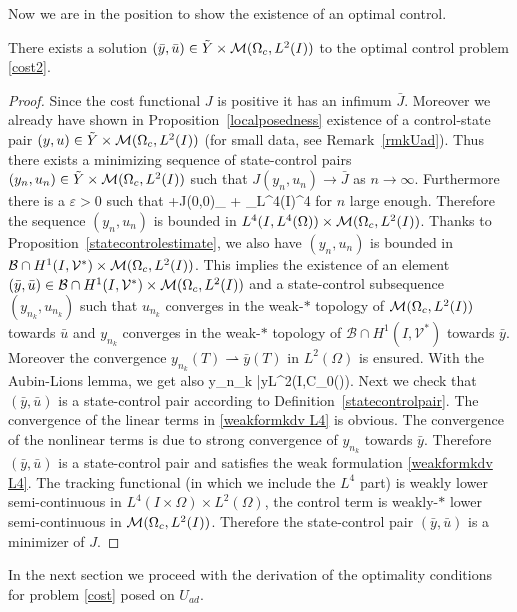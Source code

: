 Now we are in the position to show the existence of an optimal control.
\begin{proposition}
There exists a solution $(\bar y, \bar u)\in \tilde Y\times \mathcal{M}(\Omega_c, L^{2}(I)) $ to the optimal control problem \eqref{cost2}.
\end{proposition}
\begin{proof}
Since the cost functional $J$ is positive it has an infimum $\bar J$. Moreover we already have shown in Proposition~\ref{localposedness} existence of a control-state pair $(y,u)\in \tilde Y\times \mathcal{M}(\Omega_c, L^{2}(I))$ (for small data, see Remark~\ref{rmkUad}). Thus there exists a minimizing sequence of state-control pairs $(y_n,u_n) \in \tilde Y\times \mathcal{M}(\Omega_c, L^{2}(I))$ such that $J(y_n, u_n) \rightarrow \bar J$ as $n \rightarrow \infty$. Furthermore there is a $\varepsilon>0$ such that
\be
\varepsilon+J(0,0)\geq \alpha {}_{\M} +  _{L^4(I\times \Omega)}^4
\ee
for $n$ large enough. Therefore the sequence $(y_n,u_n)$ is bounded in $L^4(I,L^4(\Omega))\times \mathcal{M}(\Omega_c, L^{2}(I))$. Thanks to Proposition~\ref{statecontrolestimate}, we also have $(y_n,u_n)$ is bounded in $\mathcal{B}\cap H^{1}(I, \mathcal{V}^{*})\times \mathcal{M}(\Omega_c, L^{2}(I))$. This implies the existence of an element $(\bar y, \bar u)\in \mathcal{B}\cap H^{1}(I, \mathcal{V}^{*})\times \mathcal{M}(\Omega_c, L^{2}(I))$ and a state-control subsequence $(y_{n_k},u_{n_k})$ such that $u_{n_k}$ converges in the weak-$*$ topology of $\mathcal{M}(\Omega_c, L^{2}(I))$ towards $\bar u$ and $y_{n_k}$ converges in the weak-$\ast$ topology of $\mathcal{B}\cap H^{1}(I, \mathcal{V}^{*})$ towards $\bar y$. Moreover the convergence $y_{n_k}(T) \rightharpoonup \bar y(T)$ in $L^2(\Omega)$ is ensured. With the Aubin-Lions lemma, we get also
\be
\nonumber
y_{n_k} \rightarrow \bar y\quad{}\quad L^2(I,\mathcal C_0(\Omega)).
\ee
Next we check that $(\bar y, \bar u)$ is a state-control pair according to Definition~\ref{statecontrolpair}. The convergence of the linear terms in \eqref{weakformkdv L4} is obvious. The convergence of the nonlinear terms is due to strong convergence of $y_{n_k}$ towards $\bar y$. %
Therefore $(\bar y, \bar u)$ is a state-control pair and satisfies the weak formulation \eqref{weakformkdv L4}. The tracking functional (in which we include the $L^4$ part) is weakly lower semi-continuous in $L^4(I\times \Omega)\times L^2(\Omega)$, the control term is weakly-$*$ lower semi-continuous in $\mathcal{M}(\Omega_c, L^{2}(I))$. Therefore the state-control pair $(\bar y, \bar u)$ is a minimizer of $J$.
\qquad\end{proof}

In the next section we proceed with the derivation of the optimality conditions for problem \eqref{cost} posed on $U_{ad}$.

